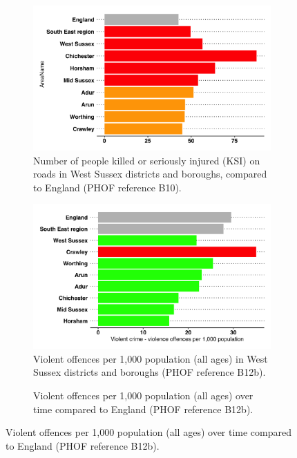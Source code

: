 \begin{figure}
    \caption[Community safety indicators in West Sussex.]{Community safety indicators in West Sussex.}\label{fig:com-safety-inds}
    \vspace*{3mm}
    \centering
    \begin{subfigure}[t]{0.45\textwidth}
        \caption{Number of people killed or seriously injured (KSI) on roads in West Sussex districts and boroughs, compared to England (PHOF reference B10).}\label{fig:ksi:dabs}
        \centering
        \includegraphics[width=.7\textwidth]{images/road_accidents_rag.png}
    \end{subfigure}
    \begin{subfigure}[t]{0.45\textwidth}
        \caption[Violent offences per 1,000 population (all ages) in West Sussex districts and boroughs.]{Violent offences per 1,000 population (all ages) in West Sussex districts and boroughs (PHOF reference B12b).}\label{fig:violence:ltla}
        \centering
        \includegraphics[width=.7\textwidth]{images/violent_offences_bar.png}
    \end{subfigure}
    \begin{subfigure}[t]{0.45\textwidth}
        \caption[Violent offences per 1,000 population (all ages) over time]{Violent offences per 1,000 population (all ages) over time compared to England (PHOF reference B12b).}\label{fig:violence:time}
        \centering

\end{subfigure}
\end{figure}
